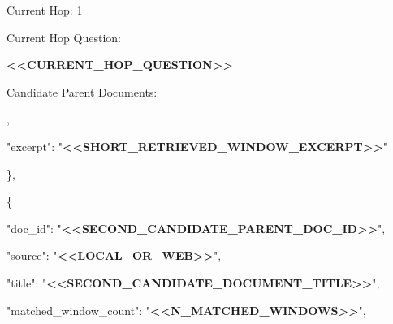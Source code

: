 \begin{tcolorbox}
\begin{scriptsize}
Current Hop: 1\par
Current Hop Question:\par
\textcolor{my-green}{\textbf{\textless{}\textless{}CURRENT\_HOP\_QUESTION\textgreater{}\textgreater{}}}\par
\mbox{}\par
Candidate Parent Documents:\par
[\par
  \{\par
    "doc\_id": "\textcolor{my-green}{\textbf{\textless{}\textless{}CANDIDATE\_PARENT\_DOC\_ID\textgreater{}\textgreater{}}}",\par
    "source": "\textcolor{my-green}{\textbf{\textless{}\textless{}LOCAL\_OR\_WEB\textgreater{}\textgreater{}}}",\par
    "title": "\textcolor{my-green}{\textbf{\textless{}\textless{}CANDIDATE\_DOCUMENT\_TITLE\textgreater{}\textgreater{}}}",\par
    "matched\_window\_count": "\textcolor{my-green}{\textbf{\textless{}\textless{}N\_MATCHED\_WINDOWS\textgreater{}\textgreater{}}}",\par
    "total\_window\_count": "\textcolor{my-green}{\textbf{\textless{}\textless{}N\_TOTAL\_WINDOWS\textgreater{}\textgreater{}}}",\par
    "best\_rank": "\textcolor{my-green}{\textbf{\textless{}\textless{}BEST\_RETRIEVAL\_RANK\textgreater{}\textgreater{}}}",\par
    "top\_queries": [\par
      "\textcolor{my-green}{\textbf{\textless{}\textless{}RETRIEVAL\_QUERY\_THAT\_FOUND\_THIS\_DOC\textgreater{}\textgreater{}}}"\par
    ],\par
    "excerpt": "\textcolor{my-green}{\textbf{\textless{}\textless{}SHORT\_RETRIEVED\_WINDOW\_EXCERPT\textgreater{}\textgreater{}}}"\par
  \},\par
  \{\par
    "doc\_id": "\textcolor{my-green}{\textbf{\textless{}\textless{}SECOND\_CANDIDATE\_PARENT\_DOC\_ID\textgreater{}\textgreater{}}}",\par
    "source": "\textcolor{my-green}{\textbf{\textless{}\textless{}LOCAL\_OR\_WEB\textgreater{}\textgreater{}}}",\par
    "title": "\textcolor{my-green}{\textbf{\textless{}\textless{}SECOND\_CANDIDATE\_DOCUMENT\_TITLE\textgreater{}\textgreater{}}}",\par
    "matched\_window\_count": "\textcolor{my-green}{\textbf{\textless{}\textless{}N\_MATCHED\_WINDOWS\textgreater{}\textgreater{}}}",\par

\end{scriptsize}
\end{tcolorbox}
